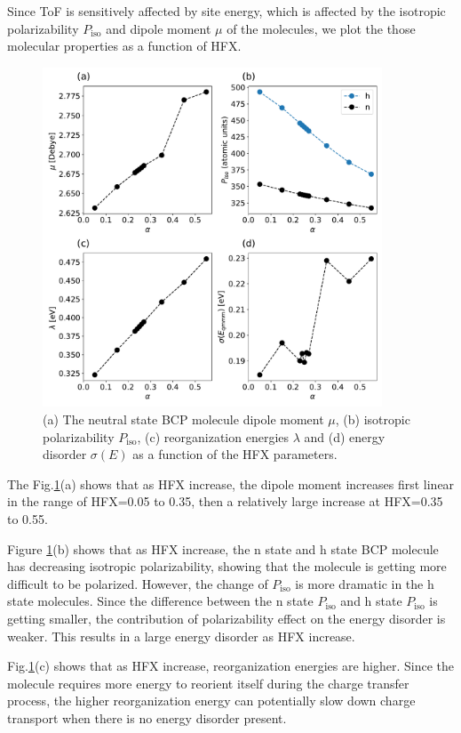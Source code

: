 \documentclass[letterpaper,12pt]{article}
\begin{document}
Since ToF is sensitively affected by site energy, which is affected by the isotropic polarizability $P_\text{iso}$ and dipole moment $\mu$ of the molecules, we plot the those molecular properties as a function of HFX. 
\begin{figure}[H]
    \centering
    \includegraphics[width=0.9\textwidth]{figs/BCP_HFX/fig_autogen_BCP.pdf}
    \caption{(a) The neutral state BCP molecule dipole moment $\mu$, (b) isotropic polarizability $P_\text{iso}$, (c) reorganization energies $\lambda$ and (d) energy disorder $\sigma(E)$ as a function of the HFX parameters. }
    \label{fig:autogen}
\end{figure}
The Fig.\ref{fig:autogen}(a) shows that as HFX increase, the dipole moment increases first linear in the range of HFX=0.05 to 0.35, then a relatively large increase at HFX=0.35 to 0.55.
 
Figure \ref{fig:autogen}(b) shows that as HFX increase, the n state and h state BCP molecule has decreasing isotropic polarizability, showing that the molecule is getting more difficult to be polarized. 
However, the change of $P_\text{iso}$ is more dramatic in the h state molecules. 
Since the difference between the n state $P_\text{iso}$ and h state $P_\text{iso}$ is getting smaller, the contribution of polarizability effect on the energy disorder is weaker. This results in a large energy disorder as HFX increase.

Fig.\ref{fig:autogen}(c) shows that as HFX increase, reorganization energies are higher. Since the molecule requires more energy to reorient itself during the charge transfer process, the higher reorganization energy can potentially slow down charge transport when there is no energy disorder present.
\end{document}
